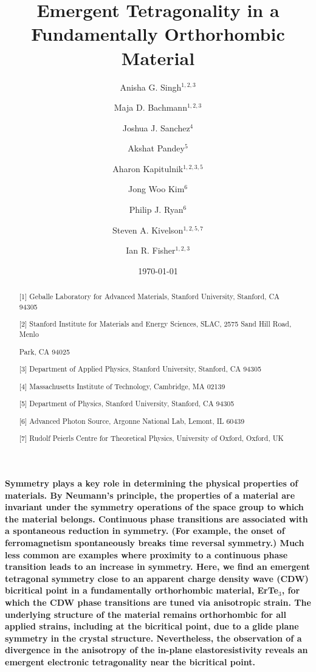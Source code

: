 \documentclass[%
 reprint, %
amsmath,amssymb,
aps,
]{revtex4-2}
\begin{document}


\title{Emergent Tetragonality in a Fundamentally Orthorhombic Material}%


\author{Anisha G. Singh$^{1,2,3}$}
\author{Maja D. Bachmann$^{1,2,3}$}
\author{Joshua J. Sanchez$^4$}
\author{Akshat Pandey$^5$}
\author{Aharon Kapitulnik$^{1,2,3,5}$}
\author{Jong Woo Kim$^6$}
\author{Philip J. Ryan$^6$}
\author{Steven A. Kivelson$^{1,2,5,7}$}
\author{Ian R. Fisher$^{1,2,3}$}
\begin{abstract}
[1] Geballe Laboratory for Advanced Materials, Stanford University, Stanford, CA 94305

[2] Stanford Institute for Materials and Energy Sciences, SLAC, 2575 Sand Hill Road, Menlo 

Park, CA 94025

[3] Department of Applied Physics, Stanford University,  Stanford, CA 94305

[4] Massachusetts Institute of Technology, Cambridge, MA 02139

[5] Department of Physics, Stanford University,  Stanford, CA 94305

[6] Advanced Photon Source, Argonne National Lab, Lemont, IL 60439

[7] Rudolf Peierls Centre for Theoretical Physics, University of Oxford, Oxford, UK

\end{abstract}


\maketitle
\date{\today}%


\textbf{Symmetry plays a key role in determining the physical properties of materials. By Neumann's principle, the properties of a material are invariant under the symmetry operations of the space group to which the material belongs. Continuous phase transitions are associated with a spontaneous reduction in symmetry. (For example, the onset of ferromagnetism spontaneously breaks time reversal symmetry.) Much less common are examples where proximity to a continuous phase transition leads to an increase in symmetry. Here, we find an emergent tetragonal symmetry close to an apparent charge density wave (CDW) bicritical point in a fundamentally orthorhombic material, ErTe$_3$, for which the CDW phase transitions are tuned via anisotropic strain. The underlying structure of the material remains orthorhombic for all applied strains, including at the  bicritical point, due to a glide plane symmetry in the crystal structure. Nevertheless, the observation of a divergence in the anisotropy of the in-plane elastoresistivity reveals an emergent electronic tetragonality near the  bicritical point.}
\end{document}
